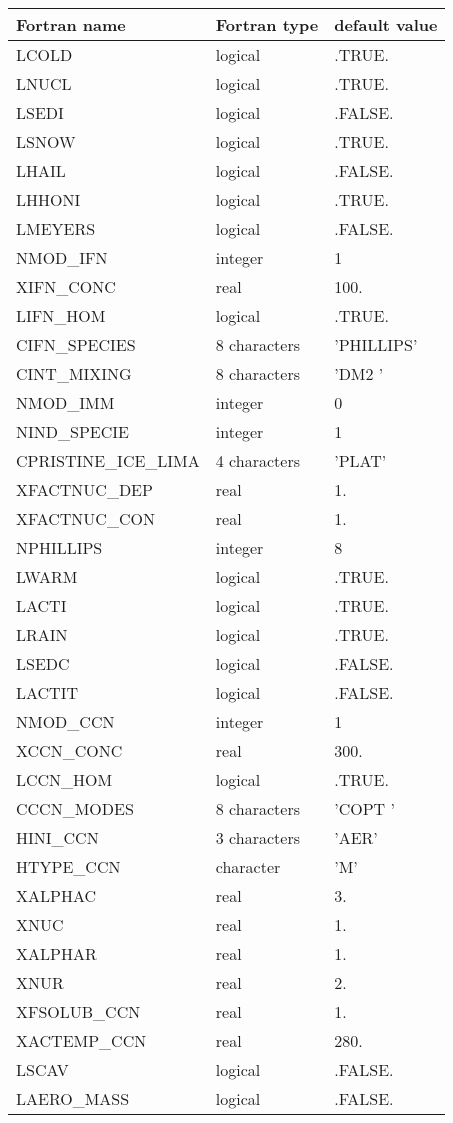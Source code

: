 \begin{center}
\begin{tabular} {|l|l|l|}
\hline
Fortran name & Fortran type & default value \\
\hline
LCOLD         &  logical     & .TRUE. \\
LNUCL & logical	  &  .TRUE. \\
LSEDI &  logical&  .FALSE. \\
LSNOW & logical  &  .TRUE.\\
LHAIL &  logical& .FALSE. \\
LHHONI & logical &  .TRUE.\\
LMEYERS & logical   & .FALSE. \\
NMOD\_IFN & integer   & 1  \\
XIFN\_CONC & real & 100.  \\
LIFN\_HOM & logical & .TRUE.  \\
CIFN\_SPECIES & 8 characters   & 'PHILLIPS' \\
CINT\_MIXING &8 characters  & 'DM2     ' \\
NMOD\_IMM & integer &0  \\
NIND\_SPECIE & integer & 1 \\
CPRISTINE\_ICE\_LIMA & 4 characters &  'PLAT' \\
XFACTNUC\_DEP & real  & 1. \\
XFACTNUC\_CON & real & 1. \\
NPHILLIPS & integer  & 8 \\
LWARM & logical  & .TRUE. \\
LACTI& logical  & .TRUE. \\
LRAIN& logical  & .TRUE. \\
LSEDC& logical  & .FALSE. \\
LACTIT& logical  & .FALSE. \\
NMOD\_CCN & integer   & 1  \\
XCCN\_CONC & real & 300.  \\
LCCN\_HOM & logical & .TRUE.  \\
CCCN\_MODES &  8 characters & 'COPT    '  \\
HINI\_CCN & 3 characters  & 'AER' \\
HTYPE\_CCN & character & 'M'  \\
XALPHAC & real & 3.  \\
XNUC & real  & 1.  \\
XALPHAR &  real& 1. \\
XNUR & real  & 2. \\
XFSOLUB\_CCN & real & 1.  \\
XACTEMP\_CCN & real  & 280. \\
LSCAV & logical  & .FALSE.  \\
LAERO\_MASS & logical  & .FALSE.  \\
\hline
\end{tabular}
\end{center}
